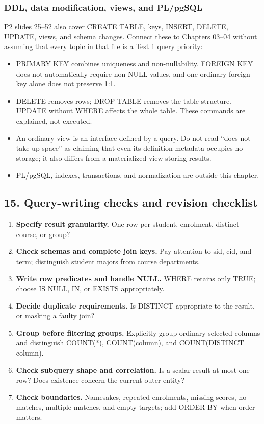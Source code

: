 \subsubsection{DDL, data modification, views, and PL/pgSQL}\label{06_sql_queries_en-ddl-data-modification-views-and-plpgsql}

P2 slides 25--52 also cover CREATE TABLE, keys, INSERT, DELETE, UPDATE, views, and schema changes. Connect these to Chapters 03--04 without assuming that every topic in that file is a Test 1 query priority:

\begin{itemize}
\tightlist
\item
  PRIMARY KEY combines uniqueness and non-nullability. FOREIGN KEY does not automatically require non-NULL values, and one ordinary foreign key alone does not preserve 1:1.
\item
  DELETE removes rows; DROP TABLE removes the table structure. UPDATE without WHERE affects the whole table. These commands are explained, not executed.
\item
  An ordinary view is an interface defined by a query. Do not read ``does not take up space'' as claiming that even its definition metadata occupies no storage; it also differs from a materialized view storing results.
\item
  PL/pgSQL, indexes, transactions, and normalization are outside this chapter.
\end{itemize}

\subsection{15. Query-writing checks and revision checklist}\label{06_sql_queries_en-query-writing-checks-and-revision-checklist}

\begin{enumerate}
\def\labelenumi{\arabic{enumi}.}
\tightlist
\item
  \textbf{Specify result granularity.} One row per student, enrolment, distinct course, or group?
\item
  \textbf{Check schemas and complete join keys.} Pay attention to sid, cid, and term; distinguish student majors from course departments.
\item
  \textbf{Write row predicates and handle NULL.} WHERE retains only TRUE; choose IS NULL, IN, or EXISTS appropriately.
\item
  \textbf{Decide duplicate requirements.} Is DISTINCT appropriate to the result, or masking a faulty join?
\item
  \textbf{Group before filtering groups.} Explicitly group ordinary selected columns and distinguish COUNT(*), COUNT(column), and COUNT(DISTINCT column).
\item
  \textbf{Check subquery shape and correlation.} Is a scalar result at most one row? Does existence concern the current outer entity?
\item
  \textbf{Check boundaries.} Namesakes, repeated enrolments, missing scores, no matches, multiple matches, and empty targets; add ORDER BY when order matters.
\end{enumerate}

